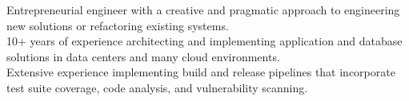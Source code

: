 

\begin{cvparagraph}

Entrepreneurial engineer with a creative and pragmatic approach to engineering new solutions or refactoring existing systems.
\\10+ years of experience architecting and implementing application and database solutions in data centers and many cloud environments.
\\Extensive experience implementing build and release pipelines that incorporate test suite coverage, code analysis, and vulnerability scanning.
\end{cvparagraph}
